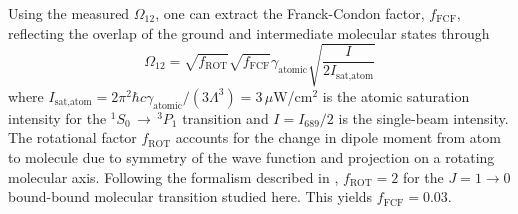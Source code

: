 Using the measured $\Omega_{12}$, one can extract the Franck-Condon factor, $f_{\text{FCF}}$, reflecting the overlap of the ground and intermediate molecular states through
\begin{equation}\label{Eq:FranckCondonRabiFrequency}
	\Omega_{12}=\sqrt{f_{\text{ROT}}}\sqrt{f_{\text{FCF}}}\gamma_{\text{atomic}}\sqrt{\frac{I}{2 I_{\text{sat,atom}}}}
\end{equation}
where $I_{\text{sat,atom}}=2\pi^2\hbar c \gamma_{\text{atomic}}/(3\Lambda^3)=3$\,$\mu$W/cm$^2$ is the atomic saturation intensity for the $^1S_0\,\rightarrow\,^3P_1$ transition and $I=I_{689}/2$ is the single-beam intensity.
The rotational factor $f_{\text{ROT}}$ accounts for the change in dipole moment from atom to molecule due to symmetry of the wave function and projection on a rotating molecular axis.
Following the formalism described in \cite{Reschovsky2018,Pachomow2017a}, $f_{\text{ROT}}=2$ for the $J=1\rightarrow 0$ bound-bound molecular transition studied here.
This yields $f_{\text{FCF}} = 0.03$.

%
%


